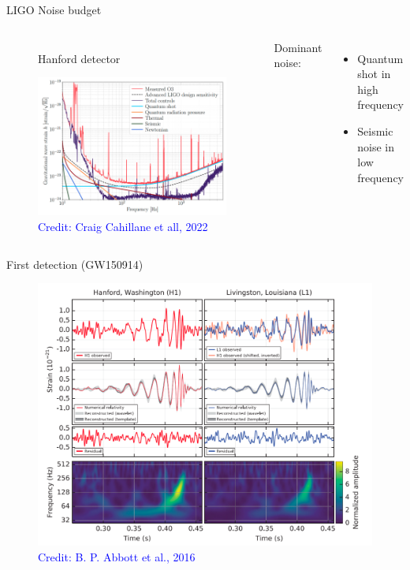 \documentclass[pdf]{beamer}
\newcommand{\credit}[1]{\tiny{\textcolor{blue}{Credit: #1}}}
\begin{document}
\begin{frame}{LIGO Noise budget}
\begin{columns}
\begin{figure}
\caption*{Hanford detector}
\includegraphics[scale=.17]{fig/noise-budget-ligo.png}
\caption*{\credit{Craig Cahillane et all, 2022}}
\end{figure}

Dominant noise:

\begin{itemize}
\item  
Quantum shot in high frequency

\item  
Seismic noise in low frequency
\end{itemize}

\end{columns}
\end{frame}

\begin{frame}{First detection (GW150914)}
\begin{figure}
\includegraphics[scale=.2]{fig/GW150914.png}
\caption*{\credit{B. P. Abbott et al., 2016}}
\end{figure}
\end{frame}
\end{document}
